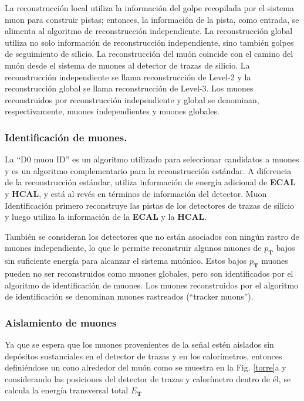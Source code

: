 La reconstrucción local utiliza la información del golpe recopilada por el sistema muon para construir pistas; entonces, la información de la pista, como entrada, se alimenta al algoritmo de reconstrucción independiente. La reconstrucción global utiliza no solo información de reconstrucción independiente, sino también golpes de seguimiento de silicio. La reconstrucción del muón coincide con el camino del muón desde el sistema de muones al detector de trazas de silicio. La reconstrucción independiente se llama reconstrucción de Level-2 y la reconstrucción global se llama reconstrucción de Level-3. Los muones reconstruidos por reconstrucción independiente y global se denominan, respectivamente, muones independientes y muones globales.



\subsubsection{Identificación de muones.}

La ``D0 muon ID'' es un algoritmo utilizado para seleccionar candidatos a muones y es un algoritmo complementario para la reconstrucción estándar. A diferencia de la reconstrucción estándar, utiliza información de energía adicional de \textbf{ECAL} y \textbf{HCAL}, y está al revés en términos de información del detector. Muon Identificación primero reconstruye las pistas de los detectores de trazas de silicio y luego utiliza la información de la \textbf{ECAL} y la \textbf{HCAL}.

También se consideran los detectores que no están asociados con ningún rastro de muones independiente, lo que le permite reconstruir algunos muones de $p_\mathbf{T}$ bajos sin suficiente energía para alcanzar el sistema muónico. Estos bajos $p_\mathbf{T}$ muones pueden no ser reconstruidos como muones globales, pero son identificados por el algoritmo de identificación de muones. Los muones reconstruidos por el algoritmo de identificación se denominan muones rastreados (``tracker muons'').

\subsubsection{Aislamiento de muones}


Ya que se espera que los muones provenientes de la señal estén aislados sin depósitos sustanciales en el detector de trazas y en los calorímetros, entonces definiéndose un cono alrededor del muón como se muestra en la Fig. \ref{torre}a y considerando las posiciones del detector de trazas y calorímetro dentro de él, se calcula la energía transversal total $E_\mathbf{T}$

